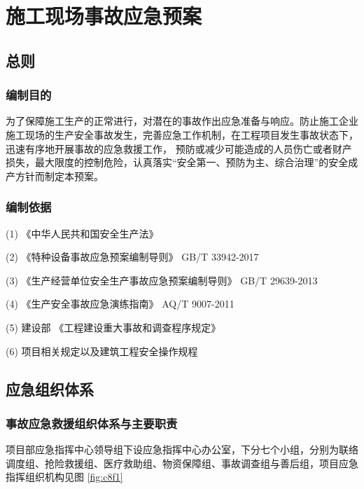 \section{施工现场事故应急预案}
\subsection{总则}
\subsubsection{编制目的}

为了保障施工生产的正常进行，对潜在的事故作出应急准备与响应。防止施工企业施工现场的生产安全事故发生，完善应急工作机制，在工程项目发生事故状态下，迅速有序地开展事故的应急救援工作，
预防或减少可能造成的人员伤亡或者财产损失，最大限度的控制危险，认真落实“安全第一、预防为主、综合治理”的安全成产方针而制定本预案。

\subsubsection{编制依据}

(1)	《中华人民共和国安全生产法》

(2) 《特种设备事故应急预案编制导则》 GB/T 33942-2017

(3) 《生产经营单位安全生产事故应急预案编制导则》 GB/T 29639-2013

(4) 《生产安全事故应急演练指南》 AQ/T 9007-2011

(5) 建设部 《工程建设重大事故和调查程序规定》

(6) 项目相关规定以及建筑工程安全操作规程

\subsection{应急组织体系}
\subsubsection{事故应急救援组织体系与主要职责}

项目部应急指挥中心领导组下设应急指挥中心办公室，下分七个小组，分别为联络调度组、抢险救援组、医疗救助组、物资保障组、事故调查组与善后组，项目应急指挥组织机构见图 \ref{fig:c8f1}

